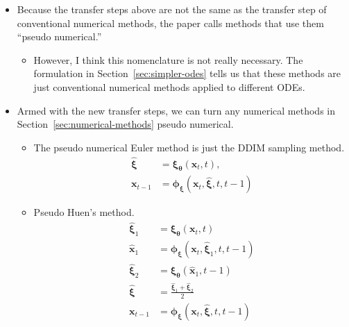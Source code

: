\documentclass[10pt]{article}
\newcommand{\ve}[1]{\mathbf{#1}}
\newcommand{\ves}[1]{\boldsymbol{#1}}
\begin{document}
\begin{itemize}
  \item Because the transfer steps above are not the same as the transfer step of conventional numerical methods, the paper calls methods that use them ``pseudo numerical.'' 
  \begin{itemize}
    \item However, I think this nomenclature is not really necessary. The formulation in Section~\ref{sec:simpler-odes} tells us that these methods are just conventional numerical methods applied to different ODEs.
  \end{itemize}
  
  \item Armed with the new transfer steps, we can turn any numerical methods in Section~\ref{sec:numerical-methods} pseudo numerical.
  \begin{itemize}
    \item The pseudo numerical Euler method is just the DDIM sampling method.
    \begin{align*}
      \widehat{\ves{\xi}} &= \ves{\xi}_{\ves{\theta}}(\ve{x}_t, t), \\
      \ve{x}_{t-1} &= \ves{\phi}_{\ves{\xi}}(\ve{x}_t, \widehat{\ves{\xi}}, t, t-1) 
    \end{align*}

    \item Pseudo Huen's method.
    \begin{align*}
      \widehat{\ves{\xi}}_1 &= \ves{\xi}_{\ves{\theta}}(\ve{x}_t, t) \\
      \widehat{\ve{x}}_1 &= \ves{\phi}_{\ves{\xi}}(\ve{x}_t, \widehat{\ves{\xi}}_1, t, t-1) \\
      \widehat{\ves{\xi}}_2 &= \ves{\xi}_{\ves{\theta}}(\widehat{\ve{x}}_1, t-1) \\
      \widehat{\ves{\xi}} &= \frac{\widehat{\ves{\xi}}_1  + \widehat{\ves{\xi}}_2}{2} \\
      \ve{x}_{t-1} &= \ves{\phi}_{\ves{\xi}}(\ve{x}_t, \widehat{\ves{\xi}}, t, t-1) 
    \end{align*}


\end{itemize}
\end{itemize}
\end{document}
